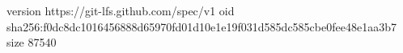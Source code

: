 version https://git-lfs.github.com/spec/v1
oid sha256:f0dc8dc1016456888d65970fd01d10e1e19f031d585dc585cbe0fee48e1aa3b7
size 87540
